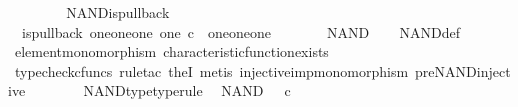 \begin{isabellebody}
\ \ \ \ \isamarkupfalse%
\isanewline
\ \ \isamarkupfalse%
\isanewline
{}\isamarkupfalse%
%
\endisatagproof
{\isafoldproof}%
%
\isadelimproof
\isanewline
%
\endisadelimproof
\isanewline
{}\isamarkupfalse%
\ NAND{\isacharunderscore}{\kern0pt}is{\isacharunderscore}{\kern0pt}pullback{\isacharcolon}{\kern0pt}\isanewline
\ \ {\isachardoublequoteopen}is{\isacharunderscore}{\kern0pt}pullback\ {\isacharparenleft}{\kern0pt}one{\isasymCoprod}{\isacharparenleft}{\kern0pt}one{\isasymCoprod}one{\isacharparenright}{\kern0pt}{\isacharparenright}{\kern0pt}\ one\ {\isacharparenleft}{\kern0pt}{\isasymOmega}{\isasymtimes}\isactrlsub c{\isasymOmega}{\isacharparenright}{\kern0pt}\ {\isasymOmega}\ {\isacharparenleft}{\kern0pt}{\isasymbeta}\isactrlbsub {\isacharparenleft}{\kern0pt}one{\isasymCoprod}{\isacharparenleft}{\kern0pt}one{\isasymCoprod}one{\isacharparenright}{\kern0pt}{\isacharparenright}{\kern0pt}\isactrlesub {\isacharparenright}{\kern0pt}\ {\isasymt}\ {\isacharparenleft}{\kern0pt}{\isasymlangle}{\isasymf}{\isacharcomma}{\kern0pt}\ {\isasymf}{\isasymrangle}{\isasymamalg}\ {\isacharparenleft}{\kern0pt}{\isasymlangle}{\isasymt}{\isacharcomma}{\kern0pt}\ {\isasymf}{\isasymrangle}\ {\isasymamalg}{\isasymlangle}{\isasymf}{\isacharcomma}{\kern0pt}\ {\isasymt}{\isasymrangle}{\isacharparenright}{\kern0pt}{\isacharparenright}{\kern0pt}\ NAND{\isachardoublequoteclose}\isanewline
%
\isadelimproof
\ \ %
\endisadelimproof
%
\isatagproof
{}\isamarkupfalse%
\ NAND{\isacharunderscore}{\kern0pt}def\isanewline
\ \ \isamarkupfalse%
\ element{\isacharunderscore}{\kern0pt}monomorphism\ characteristic{\isacharunderscore}{\kern0pt}function{\isacharunderscore}{\kern0pt}exists\isanewline
\ \ \isamarkupfalse%
\ {\isacharparenleft}{\kern0pt}typecheck{\isacharunderscore}{\kern0pt}cfuncs{\isacharcomma}{\kern0pt}\ rule{\isacharunderscore}{\kern0pt}tac\ the{}I{}{\isacharcomma}{\kern0pt}\ metis\ injective{\isacharunderscore}{\kern0pt}imp{\isacharunderscore}{\kern0pt}monomorphism\ pre{\isacharunderscore}{\kern0pt}NAND{\isacharunderscore}{\kern0pt}injective{\isacharparenright}{\kern0pt}%
\endisatagproof
{\isafoldproof}%
%
\isadelimproof
\isanewline
%
\endisadelimproof
\ \ \ \ \ \ \isanewline
{}\isamarkupfalse%
\ NAND{\isacharunderscore}{\kern0pt}type{\isacharbrackleft}{\kern0pt}type{\isacharunderscore}{\kern0pt}rule{\isacharbrackright}{\kern0pt}{\isacharcolon}{\kern0pt}\isanewline
\ \ {\isachardoublequoteopen}NAND\ {\isacharcolon}{\kern0pt}\ {\isasymOmega}\ {\isasymtimes}\isactrlsub c\ {\isasymOmega}\ {\isasymrightarrow}\ {\isasymOmega}{\isachardoublequoteclose}\isanewline

\end{isabellebody}
